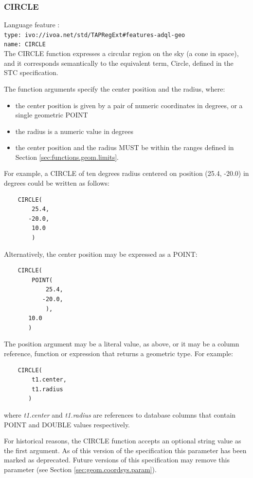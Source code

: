 \documentclass[11pt,a4paper]{ivoa}
\newcommand{\STCspec}{STC specification\xspace}
\newcommand{\SectionRef}[1]{Section \ref{#1}\xspace}
\newcommand{\SectionSee}[1]{(see Section \ref{#1})\xspace}
\begin{document}
\subsubsection{CIRCLE}
\label{sec:functions.geom.circle}
{\footnotesize Language feature :}\\
{\footnotesize \verb|type: ivo://ivoa.net/std/TAPRegExt#features-adql-geo|}\\
{\footnotesize \verb|name: CIRCLE|}\\

The CIRCLE function expresses a circular region on the sky (a cone in space),
and it corresponds semantically to the equivalent term, Circle, defined in
the \STCspec.

The function arguments specify the center position and the radius, where:
\begin{itemize}
    \item the center position is given by a pair of numeric coordinates
    in degrees, or a single geometric POINT
    \item the radius is a numeric value in degrees
    \item the center position and the radius MUST be within the ranges defined in
    \SectionRef{sec:functions.geom.limits}.
\end{itemize}

For example, a CIRCLE of ten degrees radius centered on position
(25.4, -20.0) in degrees could be written as follows:
\begin{verbatim}
    CIRCLE(
        25.4,
       -20.0,
        10.0
        )
\end{verbatim}

Alternatively, the center position may be expressed as a POINT:
\begin{verbatim}
    CIRCLE(
        POINT(
            25.4,
           -20.0,
            ),
       10.0
       )
\end{verbatim}

The position argument may be a literal value, as above, or it may be a
column reference, function or expression that returns a geometric type.
For example:
\begin{verbatim}
    CIRCLE(
        t1.center,
        t1.radius
       )
\end{verbatim}
where \textit{t1.center} and \textit{t1.radius} are references to
database columns that contain POINT and DOUBLE values respectively.

For historical reasons, the CIRCLE function accepts an optional string
value as the first argument.
As of this version of the specification this parameter has been
marked as deprecated.
Future versions of this specification may remove this parameter
\SectionSee{sec:geom.coordsys.param}.
\end{document}
